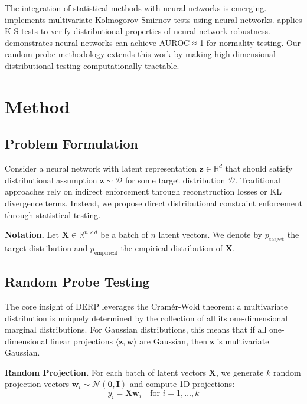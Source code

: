\documentclass{article}
\begin{document}
The integration of statistical methods with neural networks is emerging. \citet{paik2023maximum} implements multivariate Kolmogorov-Smirnov tests using neural networks. \citet{bosman2023robustness} applies K-S tests to verify distributional properties of neural network robustness. \citet{simic2020testing} demonstrates neural networks can achieve AUROC ≈ 1 for normality testing. Our random probe methodology extends this work by making high-dimensional distributional testing computationally tractable.

\section{Method}

\subsection{Problem Formulation}

Consider a neural network with latent representation $\mathbf{z} \in \mathbb{R}^d$ that should satisfy distributional assumption $\mathbf{z} \sim \mathcal{D}$ for some target distribution $\mathcal{D}$. Traditional approaches rely on indirect enforcement through reconstruction losses or KL divergence terms. Instead, we propose direct distributional constraint enforcement through statistical testing.

\textbf{Notation.} Let $\mathbf{X} \in \mathbb{R}^{n \times d}$ be a batch of $n$ latent vectors. We denote by $p_{\text{target}}$ the target distribution and $p_{\text{empirical}}$ the empirical distribution of $\mathbf{X}$.

\subsection{Random Probe Testing}

The core insight of DERP leverages the Cramér-Wold theorem: a multivariate distribution is uniquely determined by the collection of all its one-dimensional marginal distributions. For Gaussian distributions, this means that if all one-dimensional linear projections $\langle \mathbf{z}, \mathbf{w} \rangle$ are Gaussian, then $\mathbf{z}$ is multivariate Gaussian.

\textbf{Random Projection.} For each batch of latent vectors $\mathbf{X}$, we generate $k$ random projection vectors $\mathbf{w}_i \sim \mathcal{N}(\mathbf{0}, \mathbf{I})$ and compute 1D projections:
\begin{equation}
y_i = \mathbf{X} \mathbf{w}_i \quad \text{for } i = 1, \ldots, k
\end{equation}
\end{document}
